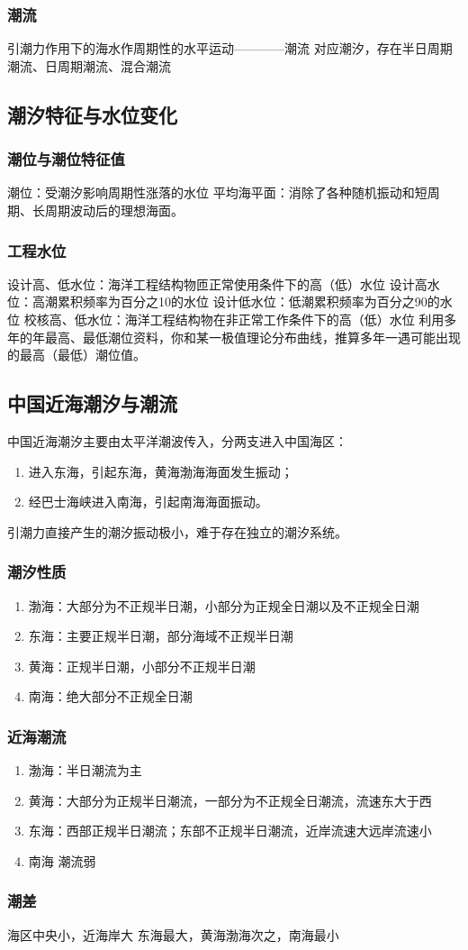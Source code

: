 				\subsubsection{潮流}
				引潮力作用下的海水作周期性的水平运动————潮流
				对应潮汐，存在半日周期潮流、日周期潮流、混合潮流
				\subsection{潮汐特征与水位变化}
				\subsubsection{潮位与潮位特征值}
				潮位：受潮汐影响周期性涨落的水位
				平均海平面：消除了各种随机振动和短周期、长周期波动后的理想海面。
				\subsubsection{工程水位}
				设计高、低水位：海洋工程结构物匝正常使用条件下的高（低）水位
				设计高水位：高潮累积频率为百分之10的水位
				设计低水位：低潮累积频率为百分之90的水位
				校核高、低水位：海洋工程结构物在非正常工作条件下的高（低）水位
				利用多年的年最高、最低潮位资料，你和某一极值理论分布曲线，推算多年一遇可能出现的最高（最低）潮位值。
				\subsection{中国近海潮汐与潮流}
				中国近海潮汐主要由太平洋潮波传入，分两支进入中国海区：
				\begin{enumerate}
					\item 进入东海，引起东海，黄海渤海海面发生振动；
					\item 经巴士海峡进入南海，引起南海海面振动。
				\end{enumerate}
				引潮力直接产生的潮汐振动极小，难于存在独立的潮汐系统。
				\subsubsection{潮汐性质}
				\begin{enumerate}
					\item 渤海：大部分为不正规半日潮，小部分为正规全日潮以及不正规全日潮
					\item 东海：主要正规半日潮，部分海域不正规半日潮
					\item 黄海：正规半日潮，小部分不正规半日潮
					\item 南海：绝大部分不正规全日潮 
				\end{enumerate}
				\subsubsection{近海潮流}
				\begin{enumerate}
					\item 渤海：半日潮流为主
					\item 黄海：大部分为正规半日潮流，一部分为不正规全日潮流，流速东大于西
					\item 东海：西部正规半日潮流；东部不正规半日潮流，近岸流速大远岸流速小
					\item 南海 潮流弱
				\end{enumerate}
				\subsubsection{潮差}
				海区中央小，近海岸大
				东海最大，黄海渤海次之，南海最小
				
